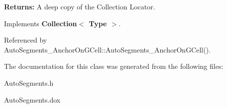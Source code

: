 {\bfseries Returns\+:} A deep copy of the Collection Locator. 

Implements \textbf{ Collection$<$ Type $>$}.



Referenced by Auto\+Segments\+\_\+\+Anchor\+On\+G\+Cell\+::\+Auto\+Segments\+\_\+\+Anchor\+On\+G\+Cell().



The documentation for this class was generated from the following files\+:\begin{DoxyCompactItemize}
\item 
Auto\+Segments.\+h\item 
Auto\+Segments.\+dox\end{DoxyCompactItemize}
